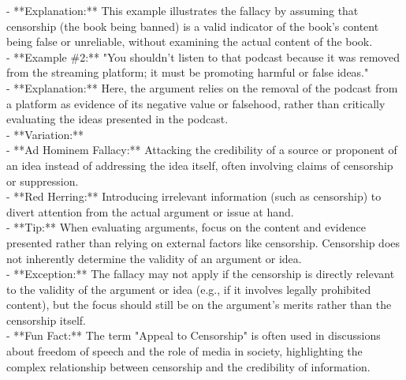 \documentclass[a4paper,12pt,single,pdftex]{scrartcl}
\begin{document}
    
      - **Explanation:** This example illustrates the fallacy by assuming that censorship (the book being banned) is a valid indicator of the book’s content being false or unreliable, without examining the actual content of the book.
    \\

    
      - **Example \#2:** "You shouldn’t listen to that podcast because it was removed from the streaming platform; it must be promoting harmful or false ideas."
    \\

    
      - **Explanation:** Here, the argument relies on the removal of the podcast from a platform as evidence of its negative value or falsehood, rather than critically evaluating the ideas presented in the podcast.
    \\

    
      - **Variation:**
    \\

    
        - **Ad Hominem Fallacy:** Attacking the credibility of a source or proponent of an idea instead of addressing the idea itself, often involving claims of censorship or suppression.
    \\

    
        - **Red Herring:** Introducing irrelevant information (such as censorship) to divert attention from the actual argument or issue at hand.
    \\

    
      - **Tip:** When evaluating arguments, focus on the content and evidence presented rather than relying on external factors like censorship. Censorship does not inherently determine the validity of an argument or idea.
    \\

    
      - **Exception:** The fallacy may not apply if the censorship is directly relevant to the validity of the argument or idea (e.g., if it involves legally prohibited content), but the focus should still be on the argument's merits rather than the censorship itself.
    \\

    
      - **Fun Fact:** The term "Appeal to Censorship" is often used in discussions about freedom of speech and the role of media in society, highlighting the complex relationship between censorship and the credibility of information.
    \\
\end{document}
